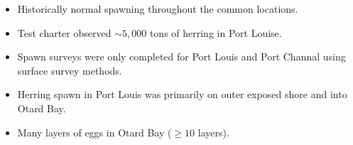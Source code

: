 \begin{itemize}
\item Historically normal spawning throughout the common locations.
\item Test charter observed $\sim 5,000$ tons of herring in Port Louise.
\item Spawn surveys were only completed for Port Louis and Port Channal using surface survey methods.
\item Herring spawn in Port Louis was primarily on outer exposed shore and into Otard Bay.
\item Many layers of eggs in Otard Bay ($\geq 10$ layers).
\end{itemize}